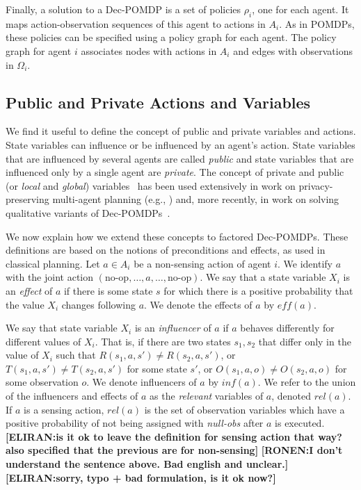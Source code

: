 \documentclass[letterpaper]{article} %
\theoremstyle{definition}
\newcommand{\eliran}[1]{\textbf{[\color{red}ELIRAN:#1]}}
\newcommand{\ronen}[1]{\textbf{[\color{blue}RONEN:#1]}}
\newcommand{\eff}{\mathit{eff}}
\begin{document}
Finally, a solution to a Dec-POMDP is a set of policies $\rho_i$, one for each agent. It maps action-observation sequences of this agent to actions in $A_i$.
As in POMDPs, these policies can be specified using a policy graph for each agent. The policy graph for agent $i$ associates nodes with actions in $A_i$
and edges with observations in $\Omega_i$. 




\subsection{Public and Private Actions and Variables}

We find it useful to define the concept of public and private variables and actions. State variables can influence or be influenced by an agent's action. State variables that are influenced by several agents are called {\em public} and state variables that are influenced only by a single agent are {\em private}.
The concept of private and public (or \emph{local} and \emph{global}) variables~\cite{FACTOREDPLAN} has been used extensively
in work on privacy-preserving multi-agent planning
(e.g., \cite{NB14,MaliahBS17}) and, more recently, in work on solving qualitative variants of Dec-POMDPs~\cite{QDECPOMDPPLAN1,QDECPOMDPPLAN2}. 

We now explain how we extend these concepts to factored Dec-POMDPs. These definitions are based on the notions of
preconditions and effects, as used in classical planning.
Let $a\in A_i$ be a non-sensing action of agent $i$. We identify $a$ with the joint action $(\mbox{no-op},\ldots, a,\ldots,\mbox{no-op})$. 
We say that a state variable $X_i$ is an {\em effect} of $a$ if there is some state $s$ for which there is a positive probability that the value $X_i$ changes following $a$.
We denote the effects of $a$ by $\eff(a)$.

We say that state variable $X_i$ is an
{\em influencer} of $a$ if $a$ behaves differently for different values of $X_i$.
That is, if there are two states $s_1,s_2$ that differ only in the value of $X_i$ such that $R(s_1,a,s')\neq R(s_2,a,s')$, or $T(s_1,a,s')\neq T(s_2,a,s')$ for some state $s'$, or $O(s_1,a,o)\neq O(s_2,a,o)$ for some observation $o$.
We denote influencers of $a$ by
$inf(a)$.
%
We refer to the union of the influencers and effects of $a$ as
the {\em relevant} variables of $a$,
denoted $rel(a)$. 
If $a$ is a sensing action, $rel(a)$ is the set of observation variables which have a positive probability of not being assigned with {\em null-obs} after $a$ is executed.
\eliran{is it ok to leave the definition for sensing action that way? also specified that the previous are for non-sensing}
\ronen{I don't understand the sentence above. Bad english and unclear.}
\eliran{sorry, typo + bad formulation, is it ok now?}
\end{document}
